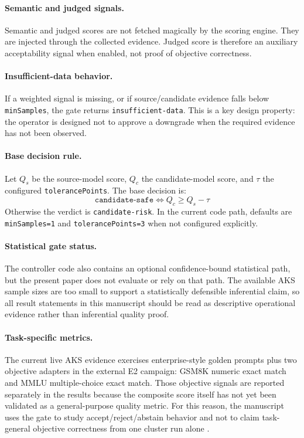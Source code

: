 \paragraph{Semantic and judged signals.}
Semantic and judged scores are not fetched magically by the scoring engine.
They are injected through the collected evidence. Judged score is therefore an
auxiliary acceptability signal when enabled, not proof of objective
correctness.

\paragraph{Insufficient-data behavior.}
If a weighted signal is missing, or if source/candidate evidence falls below
\texttt{minSamples}, the gate returns \texttt{insufficient-data}. This is a key
design property: the operator is designed not to approve a downgrade when the
required evidence has not been observed.

\paragraph{Base decision rule.}
Let \(Q_s\) be the source-model score, \(Q_c\) the candidate-model score, and
\(\tau\) the configured \texttt{tolerancePoints}. The base decision is:
\[
\texttt{candidate-safe} \iff Q_c \geq Q_s - \tau
\]
Otherwise the verdict is \texttt{candidate-risk}. In the current code path,
defaults are \texttt{minSamples=1} and \texttt{tolerancePoints=3} when not
configured explicitly.

\paragraph{Statistical gate status.}
The controller code also contains an optional confidence-bound statistical
path, but the present paper does not evaluate or rely on that path. The
available AKS sample sizes are too small to support a statistically defensible
inferential claim, so all result statements in this manuscript should be read
as descriptive operational evidence rather than inferential quality proof.

\paragraph{Task-specific metrics.}
The current live AKS evidence exercises enterprise-style golden prompts plus
two objective adapters in the external E2 campaign: GSM8K numeric exact match
and MMLU multiple-choice exact match. Those objective signals are reported
separately in the results because the composite score itself has not yet been
validated as a general-purpose quality metric. For this reason, the manuscript
uses the gate to study accept/reject/abstain behavior and not to claim
task-general objective correctness from one cluster run alone
\cite{hendrycks2020mmlu,cobbe2021gsm8k}.

